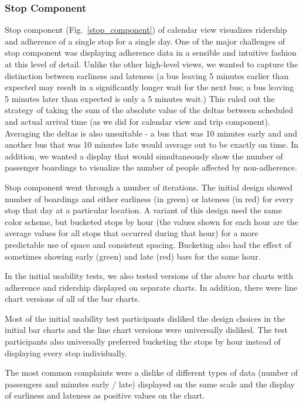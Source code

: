 \documentclass[journal]{vgtc}                %
\begin{document}
\subsubsection{Stop Component}
Stop component (Fig.~\ref{stop_component}) of calendar view visualizes ridership and adherence of a single stop for a single day. One of the major challenges of stop component was displaying adherence data in a sensible and intuitive fashion at this level of detail. Unlike the other high-level views, we wanted to capture the distinction between earliness and lateness (a bus leaving 5 minutes earlier than expected may result in a significantly longer wait for the next bus; a bus leaving 5 minutes later than expected is only a 5 minutes wait.) This ruled out the strategy of taking the sum of the absolute value of the deltas between scheduled and actual arrival time (as we did for calendar view and trip component). Averaging the deltas is also unsuitable - a bus that was 10 minutes early and and another bus that was 10 minutes late would average out to be exactly on time. In addition, we wanted a display that would simultaneously show the number of passenger boardings to visualize the number of people affected by non-adherence.

Stop component went through a number of iterations. The initial design showed number of boardings and either earliness (in green) or lateness (in red) for every stop that day at a particular location. A variant of this design used the same color scheme, but bucketed stops by hour (the values shown for each hour are the average values for all stops that occurred during that hour) for a more predictable use of space and consistent spacing. Bucketing also had the effect of sometimes showing early (green) and late (red) bars for the same hour.

In the initial usability tests, we also tested versions of the above bar charts with adherence and ridership displayed on separate charts. In addition, there were line chart versions of all of the bar charts.

Most of the initial usability test participants disliked the design choices in the initial bar charts and the line chart versions were universally disliked. The test participants also universally preferred bucketing the stops by hour instead of displaying every stop individually.

The most common complaints were a dislike of different types of data (number of passengers and minutes early / late) displayed on the same scale and the display of earliness and lateness as positive values on the chart.
\end{document}

